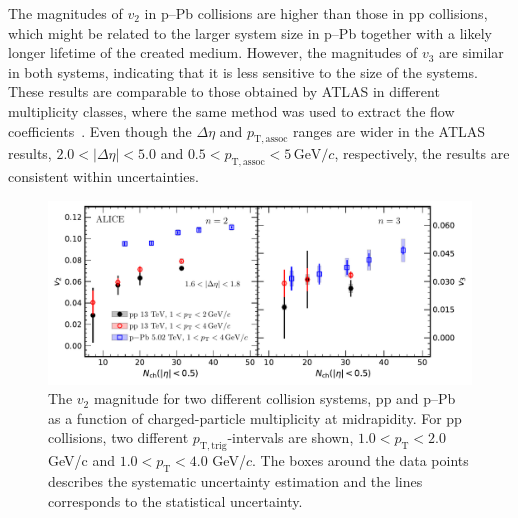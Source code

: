 The magnitudes of $v_2$ in p--Pb collisions are higher than those in pp collisions, which might be related to the larger system size in p--Pb together with a likely longer lifetime of the created medium.
However, the magnitudes of $v_3$ are similar in both systems, indicating that it is less sensitive to the size of the systems.
These results are comparable to those obtained by ATLAS in different multiplicity classes, where the same method was used to extract the flow coefficients~\cite{ATLAS:2016yzd}. Even though the $\Delta\eta$ and $p_{\mathrm{T,assoc}}$ ranges are wider in the ATLAS results, $2.0<|\Delta\eta|<5.0$ and $0.5<p_{\mathrm{T,assoc}}<5\,\mathrm{GeV}/c$, respectively, the results are consistent within uncertainties.

\begin{figure}[!t]
	\centering
\includegraphics[width=1.0\textwidth]{figures/FIG5_v2Mult_allSystems_Data.pdf} 
	\caption{The $v_2$ magnitude for two different collision systems, pp and p--Pb as a function of charged-particle multiplicity at midrapidity. For pp collisions, two different $p_\mathrm{T,trig}$-intervals are shown, $1.0<p_\mathrm{T}<2.0$ GeV/c and $1.0<p_\mathrm{T}<4.0$ GeV/$c$. The boxes around the data points describes the systematic uncertainty estimation and the lines corresponds to the statistical uncertainty.} 
	\label{fig:v2mult}
\end{figure}

